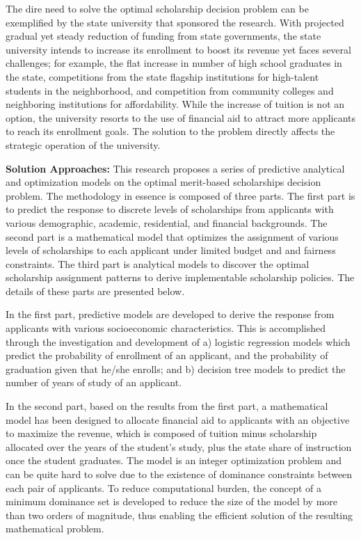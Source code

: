 \documentclass[12pt,english]{report}
\begin{document}
The dire need to solve the optimal scholarship decision problem can be
exemplified by the state university that sponsored the research.  With
projected gradual yet steady reduction of funding from state governments, the
state university intends to increase its enrollment to boost its revenue yet
faces several challenges; for example, the flat increase in number of high
school graduates in the state, competitions from the state flagship
institutions for high-talent students in the neighborhood, and competition from
community colleges and neighboring institutions for affordability.  While the
increase of tuition is not an option,  the university resorts to the use of
financial aid to attract more applicants to reach its enrollment goals.  The
solution to the problem directly affects the strategic operation of the
university.

\vspace*{.15in} 
\noindent \textbf{Solution Approaches:} 
This research proposes a series of predictive analytical and optimization
models on the optimal merit-based scholarships decision problem.  The
methodology in essence is composed of three parts. The first part is to predict
the response to discrete levels of scholarships from applicants with various
demographic, academic, residential, and financial backgrounds. The second part
is a mathematical model that optimizes the assignment of various levels of
scholarships to each applicant under limited budget and and fairness
constraints.  The third part is analytical models to discover the optimal
scholarship assignment patterns to derive implementable scholarship policies.
The details of these parts are presented below.

In the first part, predictive models are developed to derive the response from
applicants with various socioeconomic characteristics. This is accomplished
through the investigation and development of a) logistic regression models
which predict  the probability of enrollment of an applicant, and  the
probability of graduation given that he/she enrolls; and b) decision tree
models to predict the number of years of study of an applicant.

In the second part, based on the results from the first part,  a mathematical
model has been designed to allocate financial aid to applicants with an
objective to maximize the revenue, which is composed of tuition minus
scholarship allocated over the years of the student's study, plus the state
share of instruction once the student graduates.  The model is an integer
optimization problem and can be quite hard to solve due to the existence of
dominance constraints between each pair of applicants. To reduce computational
burden, the concept of a minimum dominance set is developed to reduce the size
of the model by more than two orders of magnitude, thus enabling the efficient
solution of the resulting mathematical problem.
\end{document}
